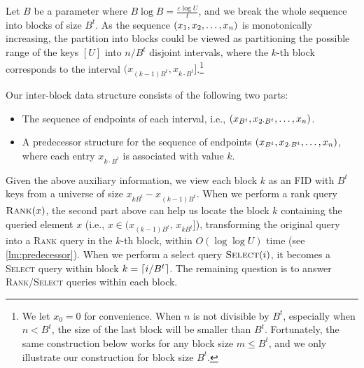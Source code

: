\documentclass{article}
\theoremstyle{plain}
\theoremstyle{definition}  \newtheorem{definition}[theorem]{Definition}
\DeclarePairedDelimiter{\ceil}{\lceil}{\rceil}
\DeclarePairedDelimiter{\bk}{(}{)}
\newcommand{\eps}{\varepsilon}
\newcommand{\rank}{\textup{\textsc{Rank}}\xspace}
\newcommand{\select}{\textup{\textsc{Select}}\xspace}
\begin{document}
Let $B$ be a parameter where $B \log B = \frac{\eps \log U}{t}$, and we break the whole sequence into blocks of size $B^t$. As the sequence $\bk{x_1, x_2, \ldots, x_n}$ is monotonically increasing, the partition into blocks could be viewed as partitioning the possible range of the keys $[U]$ into $n/B^t$ disjoint intervals, where the $k$-th block corresponds to the interval $(x_{(k-1)B^t}, x_{k\cdot B^t}]$.\footnote{We let $x_0 = 0$ for convenience. When $n$ is not divisible by $B^t$, especially when $n < B^t$, the size of the last block will be smaller than $B^t$. Fortunately, the same construction below works for any block size $m \le B^t$, and we only illustrate our construction for block size $B^t$.}

Our inter-block data structure consists of the following two parts:
\begin{itemize}
\item The sequence of endpoints of each interval, i.e., $\bk{x_{B^t}, x_{2\cdot B^t}, \ldots, x_{n}}$.
\item A predecessor structure for the sequence of endpoints $\bk{x_{B^t}, x_{2\cdot B^t}, \ldots, x_{n}}$, where each entry $x_{k\cdot B^t}$ is associated with value $k$.
\end{itemize}
Given the above auxiliary information, we view each block $k$ as an FID with $B^t$ keys from a universe of size $x_{k B^t} - x_{(k - 1)B^t}$. When we perform a rank query $\rank(x)$, the second part above can help us locate the block $k$ containing the queried element $x$ (i.e., $x \in (x_{(k-1)B^t},\, x_{k B^t}]$), transforming the original query into a \rank query in the $k$-th block, within $O(\log \log U)$ time (see \cref{lm:predecessor}). When we perform a select query $\select(i)$, it becomes a \select query within block $k = \ceil{i / B^t}$. The remaining question is to answer \rank/\select queries within each block.
\end{document}
